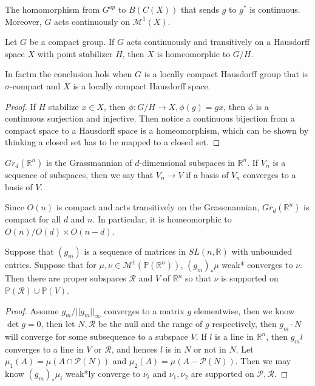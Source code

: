 \documentclass[lang=en, color=blue, ]{elegantbook}
\newcommand{\R}{\mathbb{R}}
\newcommand{\M}{\mathcal{M}}
\begin{document}
\begin{lemma}
    The homomorphism from $G^{op}$ to $B(C(X))$ that sends $g$ to $g^*$ is continuous. Moreover, $G$ acts continuously on $\M^1(X)$.
\end{lemma}

\begin{lemma}
    Let $G$ be a compact group. If $G$ acts continuously and transitively on a Hausdorff space $X$ with point stabilizer $H$, then $X$ is homeomorphic to $G/H$.\par
    In factm the conclusion hols when $G$ is a locally compact Hausdorff group that is $\sigma$-compact and $X$ is a locally compact Hausdorff space.
\end{lemma}

\begin{proof}\par
    If $H$ stabilize $x\in X$, then $\phi:G/H\to X, \phi(g) = gx$, then $\phi$ is a continuous surjection and injective. Then notice a continuous bijection from a compact space to a Hausdorff space is a homeomorphism, which can be shown by thinking a closed set has to be mapped to a closed set.
\end{proof}

\begin{definition}
    $Gr_d(\R^n)$ is the Grassmannian of $d$-dimensional subspaces in $\R^n$. If $V_n$ is a sequence of subspaces, then we say that $V_n\to V$ if a basis of $V_n$ converges to a basis of $V$.
\end{definition}

\begin{corollary}
    Since $O(n)$ is compact and acts transitively on the Grassmannian, $Gr_d(\R^n)$ is compact for all $d$ and $n$. In particular, it is homeomorphic to $O(n)/O(d)\times O(n-d)$.
\end{corollary}

\begin{lemma}
    Suppose that $(g_m)$ is a sequence of matrices in $SL(n,\R)$ with unbounded entries. Suppose that for $\mu,\nu \in \M^1(\mathbb{P}(\R^n))$, $(g_m)_*\mu$ weak* converges to $\nu$. Then there are proper subspaces $\mathcal{R}$ and $V$ of $\R^n$ so that $\nu$ is supported on $\mathbb{P}(\mathcal{R})\cup \mathbb{P}(V)$.
\end{lemma}

\begin{proof}
    Assume $g_m/||g_m||_{\infty}$ converges to a matrix $g$ elementwise, then we know $\det g = 0$, then let $N,\mathcal{R}$ be the null and the range of $g$ respectively, then $g_m\cdot N$ will converge for some subsequence to a subspace $V$. If $l$ is a line in $\R^n$, then $g_m l$ converges to a line in $V$ or $\mathcal{R}$, and hences $l$ is in $N$ or not in $N$. Let $\mu_1(A) = \mu(A\cap \mathcal{P}(N))$ and $\mu_2(A) = \mu(A- \mathcal{P}(N))$. Then we may know $(g_m)_*\mu_i$ weak*ly converge to $\nu_i$ and $\nu_1,\nu_2$ are supported on $\mathcal{P}, \mathcal{R}$. 
\end{proof}
\end{document}
